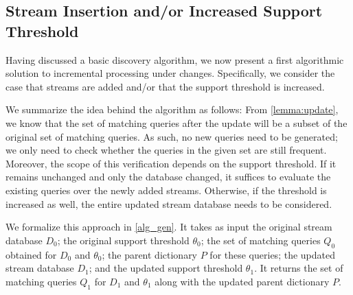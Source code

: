 %
%


\subsection{Stream Insertion and/or Increased Support
Threshold}
\label{sec:insert_increment}

Having discussed a basic discovery algorithm, we now
present a first algorithmic solution to incremental
processing under changes. Specifically, we consider the
case that streams are added and/or that the support
threshold is increased.

We summarize the idea behind the algorithm as follows:
From
\autoref{lemma:update}, we know that the set of matching
queries after the update will be a subset of the original
set of matching queries. As such, no new queries need to
be generated; we only need to check whether the
queries in the given set are still
frequent. Moreover, the scope of this verification depends
on the support threshold. If it remains unchanged and only
the database changed, it suffices to evaluate the existing
queries over the newly added streams. Otherwise, if
the threshold is increased as well, the entire updated
stream database needs to be considered.

We formalize this approach in \autoref{alg_gen}. It
takes as input the original stream database $D_0$; the
original support threshold $\theta_0$; the
set of matching queries $Q_0$ obtained for $D_0$ and
$\theta_0$; the parent dictionary $P$ for these
queries; the updated stream database $D_1$; and the
updated support threshold $\theta_1$. It returns the
set of matching queries $Q_1$ for $D_1$ and
$\theta_1$ along with the updated parent dictionary
$P$.

